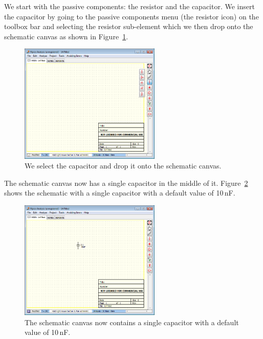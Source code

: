 \documentclass{article}
\begin{document}
We start with the passive components: the resistor and the capacitor. We insert the capacitor by going to the passive components menu (the resistor icon) on the toolbox bar and selecting the resistor sub-element which we then drop onto the schematic canvas as shown in Figure~\ref{fig:5spice:add_component}.

\begin{figure}
\begin{center}
\includegraphics[width=0.6\textwidth]{pics/5spice_add_component}
\end{center}
\caption{We select the capacitor and drop it onto the schematic canvas.}
\label{fig:5spice:add_component}
\end{figure}

The schematic canvas now has a single capacitor in the middle of it. Figure~\ref{fig:5spice:component_dropped} shows the schematic with a single capacitor with a default value of 10\,nF.

\begin{figure}
\begin{center}
\includegraphics[width=0.6\textwidth]{pics/5spice_component_dropped}
\end{center}
\caption{The schematic canvas now contains a single capacitor with a default value of 10\,nF.}
\label{fig:5spice:component_dropped}
\end{figure}
\end{document}
